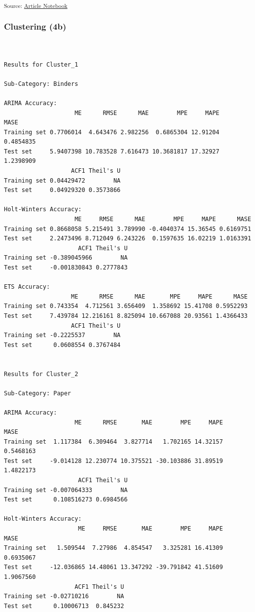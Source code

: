 \documentclass[
  letterpaper,
  DIV=11,
  numbers=noendperiod]{scrartcl}
\begin{document}
\textsubscript{Source:
\href{https://SJbrou.github.io/Supply_Chain_Data_Analysis/index.qmd.html}{Article
Notebook}}

\subsubsection{Clustering (4b)}\label{clustering-4b}

\begin{verbatim}


Results for Cluster_1 

Sub-Category: Binders 

ARIMA Accuracy:
                    ME      RMSE      MAE        MPE     MAPE      MASE
Training set 0.7706014  4.643476 2.982256  0.6865304 12.91204 0.4854835
Test set     5.9407398 10.783528 7.616473 10.3681817 17.32927 1.2398909
                   ACF1 Theil's U
Training set 0.04429472        NA
Test set     0.04929320 0.3573866

Holt-Winters Accuracy:
                    ME     RMSE      MAE        MPE     MAPE      MASE
Training set 0.8668058 5.215491 3.789990 -0.4040374 15.36545 0.6169751
Test set     2.2473496 8.712049 6.243226  0.1597635 16.02219 1.0163391
                     ACF1 Theil's U
Training set -0.389045966        NA
Test set     -0.001830843 0.2777843

ETS Accuracy:
                   ME      RMSE      MAE       MPE     MAPE      MASE
Training set 0.743354  4.712561 3.656409  1.358692 15.41708 0.5952293
Test set     7.439784 12.216161 8.825094 10.667088 20.93561 1.4366433
                   ACF1 Theil's U
Training set -0.2225537        NA
Test set      0.0608554 0.3767484


Results for Cluster_2 

Sub-Category: Paper 

ARIMA Accuracy:
                    ME      RMSE       MAE        MPE     MAPE      MASE
Training set  1.117384  6.309464  3.827714   1.702165 14.32157 0.5468163
Test set     -9.014128 12.230774 10.375521 -30.103886 31.89519 1.4822173
                     ACF1 Theil's U
Training set -0.007064333        NA
Test set      0.108516273 0.6984566

Holt-Winters Accuracy:
                     ME     RMSE       MAE        MPE     MAPE      MASE
Training set   1.509544  7.27986  4.854547   3.325281 16.41309 0.6935067
Test set     -12.036865 14.48061 13.347292 -39.791842 41.51609 1.9067560
                    ACF1 Theil's U
Training set -0.02710216        NA
Test set      0.10006713  0.845232


\end{verbatim}
\end{document}
